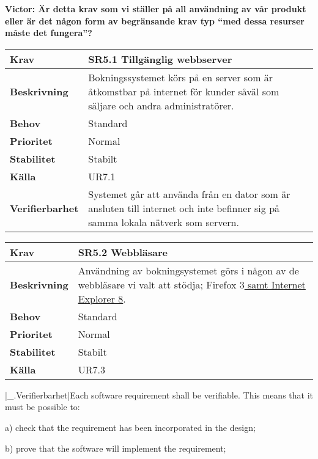 \documentclass[a4paper, twoside, 11pt, titlepage]{article}
\begin{document}
\textbf{Victor: Är detta krav som vi ställer på all användning av vår produkt eller är det någon form av begränsande krav typ ``med dessa resurser måste det fungera''?}

\begin{tabular} { p{2.6cm} p{12.5cm} }
	\hline
	\sffamily\textbf{Krav} & \sffamily\textbf{SR5.1 Tillgänglig webbserver } \\
	\hline
	\sffamily\textbf{Beskrivning} & Bokningssystemet körs på en server som är åtkomstbar på internet för kunder såväl som säljare och andra administratörer.  \\
	\hline
	\sffamily\textbf{Behov} & Standard  \\
	\hline
	\sffamily\textbf{Prioritet} & Normal  \\
	\hline
	\sffamily\textbf{Stabilitet} & Stabilt  \\
	\hline
	\sffamily\textbf{Källa} & UR7.1  \\
	\hline
	\sffamily\textbf{Verifierbarhet} & Systemet går att använda från en dator som är ansluten till internet och inte befinner sig på samma lokala nätverk som servern.  \\
	\hline
\end{tabular}
\vspace{6mm}

\begin{tabular} { p{2.6cm} p{12.5cm} }
	\hline
	\sffamily\textbf{Krav} & \sffamily\textbf{SR5.2 Webbläsare } \\
	\hline
	\sffamily\textbf{Beskrivning} & Användning av bokningsystemet görs i någon av de webbläsare vi valt att stödja; Firefox 3\underline{ samt Internet Explorer 8}.  \\
	\hline
	\sffamily\textbf{Behov} & Standard  \\
	\hline
	\sffamily\textbf{Prioritet} & Normal  \\
	\hline
	\sffamily\textbf{Stabilitet} & Stabilt  \\
	\hline
	\sffamily\textbf{Källa} & UR7.3  \\
	\hline
\end{tabular}
\vspace{6mm}

|\_.Verifierbarhet|Each software requirement shall be verifiable. This means that it must be possible to:

a) check that the requirement has been incorporated in the design;

b) prove that the software will implement the requirement;
\end{document}
